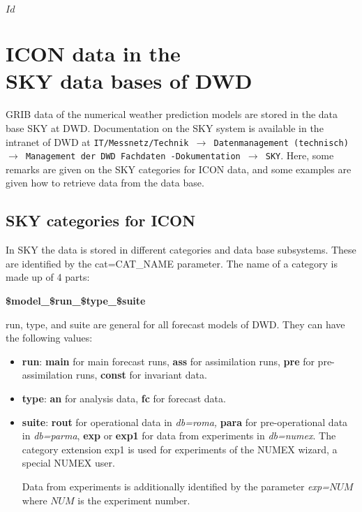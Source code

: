\svnInfo $Id$
\chapter[ICON data in the SKY data bases of DWD]{ICON data in the\\SKY data bases of DWD}


GRIB data of the numerical weather prediction models are stored in the data base
SKY at DWD.
Documentation on the SKY system is available in the intranet of DWD at
{\tt IT/Messnetz/Technik $\rightarrow$ Datenmanagement (technisch) $\rightarrow$
Management der DWD Fachdaten -Dokumentation $\rightarrow$ SKY}.
Here, some remarks are given on the SKY categories for ICON data, and some
examples are given how to retrieve data from the data base.

\section{SKY categories for ICON}\label{sec_skycat}

In SKY the data is stored in different categories and data base subsystems.
These are identified by the cat=CAT\_NAME parameter.
The name of a category is made up of 4 parts:

\begin{center}
 \begin{minipage}{0.25\textwidth}
  \centering
  \textbf{\${model}\_\${run}\_\${type}\_\${suite}}
 \end{minipage}
\end{center}
 
run, type, and suite are general for all forecast models of DWD. They can have the 
following values:
\begin{itemize}
 \item \textbf{run}: \textbf{main} for main forecast runs,
                     \textbf{ass} for assimilation runs,
                     \textbf{pre} for pre-assimilation runs,
                     \textbf{const} for invariant data.
 \item \textbf{type}: \textbf{an} for analysis data,
                      \textbf{fc} for forecast data.
 \item \textbf{suite}: \textbf{rout} for operational data in \emph{db=roma,}
                       \textbf{para} for pre-operational data in \emph{db=parma},
                       \textbf{exp} or \textbf{exp1} for data from experiments in
                       \emph{db=numex}. The category extension exp1 is used for
                       experiments of the NUMEX wizard, a special NUMEX user.

                       Data from experiments is additionally
                       identified by the parameter \emph{exp=}$NUM$ where $NUM$ is
                       the experiment number.
\end{itemize}

